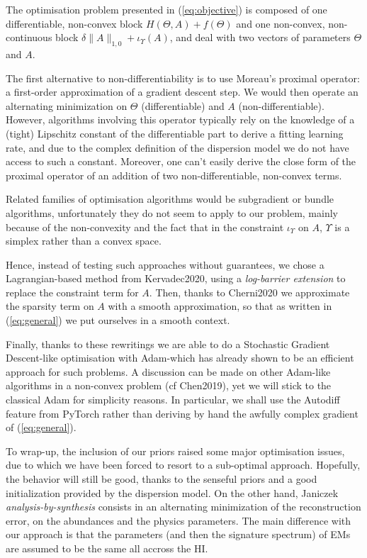\documentclass{article}
\begin{document}
The optimisation problem presented in (\ref{eq:objective}) is composed of one differentiable, non-convex block $H(\Theta, A) + f(\Theta)$ and one non-convex, non-continuous block $\delta\|A\|_{1,0} + \iota_\Upsilon (A)$, and deal with two vectors of parameters $\Theta$ and $A$.

The first alternative to non-differentiability is to use Moreau's proximal operator: a first-order approximation of a gradient descent step. We would then operate an alternating minimization on $\Theta$ (differentiable) and $A$ (non-differentiable). However, algorithms involving this operator typically rely on the knowledge of a (tight) Lipschitz constant of the differentiable part to derive a fitting learning rate, and due to the complex definition of the dispersion model we do not have access to such a constant. Moreover, one can't easily derive the close form of the proximal operator of an addition of two non-differentiable, non-convex terms.

Related families of optimisation algorithms would be subgradient or bundle algorithms, unfortunately they do not seem to apply to our problem, mainly because of the non-convexity and the fact that in the constraint $\iota_\Upsilon$ on $A$, $\Upsilon$ is a simplex rather than a convex space.

Hence, instead of testing such approaches without guarantees, we chose a Lagrangian-based method from Kervadec2020, using a \emph{log-barrier extension} to replace the constraint term for $A$. Then, thanks to Cherni2020 we approximate the sparsity term on $A$ with a smooth approximation, so that as written in (\ref{eq:general}) we put ourselves in a smooth context.

Finally, thanks to these rewritings we are able to do a Stochastic Gradient Descent-like optimisation with Adam-which has already shown to be an efficient approach for such problems. A discussion can be made on other Adam-like algorithms in a non-convex problem (cf Chen2019), yet we will stick to the classical Adam for simplicity reasons. In particular, we shall use the Autodiff feature from PyTorch rather than deriving by hand the awfully complex gradient of (\ref{eq:general}).

To wrap-up, the inclusion of our priors raised some major optimisation issues, due to which we have been forced to resort to a sub-optimal approach. Hopefully, the behavior will still be good, thanks to the senseful priors and a good initialization provided by the dispersion model. On the other hand, Janiczek \emph{analysis-by-synthesis} consists in an alternating minimization of the reconstruction error, on the abundances and the physics parameters. The main difference with our approach is that the parameters (and then the signature spectrum) of EMs are assumed to be the same all accross the HI.
\end{document}
